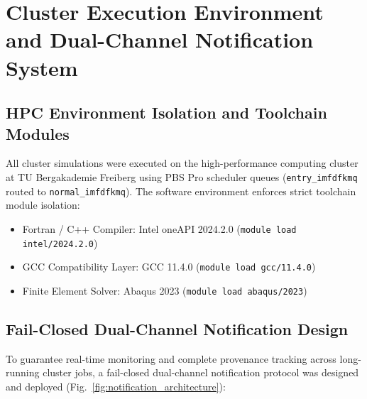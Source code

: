 \section{Cluster Execution Environment and Dual-Channel Notification System}
\label{sec:hpc_notification_architecture}

\subsection{HPC Environment Isolation and Toolchain Modules}
All cluster simulations were executed on the high-performance computing cluster at TU Bergakademie Freiberg using PBS Pro scheduler queues (\texttt{entry\_imfdfkmq} routed to \texttt{normal\_imfdfkmq}). The software environment enforces strict toolchain module isolation:
\begin{itemize}
    \item Fortran / C++ Compiler: Intel oneAPI 2024.2.0 (\texttt{module load intel/2024.2.0})
    \item GCC Compatibility Layer: GCC 11.4.0 (\texttt{module load gcc/11.4.0})
    \item Finite Element Solver: Abaqus 2023 (\texttt{module load abaqus/2023})
\end{itemize}

\subsection{Fail-Closed Dual-Channel Notification Design}
To guarantee real-time monitoring and complete provenance tracking across long-running cluster jobs, a fail-closed dual-channel notification protocol was designed and deployed (Fig.~\ref{fig:notification_architecture}):

